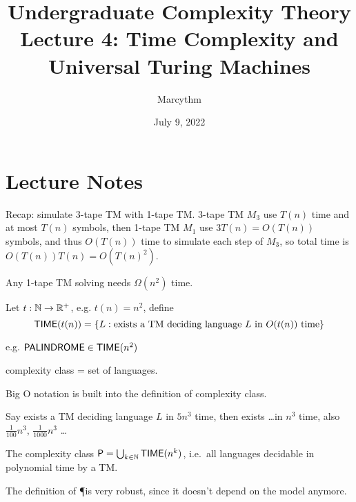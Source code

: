 \documentclass{article}
\title{Undergraduate Complexity Theory \\ Lecture 4: Time Complexity and Universal Turing Machines}
\author{Marcythm}
\date{July 9, 2022}
\begin{document}
\maketitle{}

\section{Lecture Notes}

Recap: simulate 3-tape TM with 1-tape TM. 3-tape TM \(M_3\) use \(T(n)\) time and at most \(T(n)\) symbols, then 1-tape TM \(M_1\) use \(3T(n) = O(T(n))\) symbols, and thus \(O(T(n))\) time to simulate each step of \(M_3\), so total time is \(O(T(n)) T(n) = O(T(n)^2)\).

\begin{theorem}[Hennie '65]
  Any 1-tape TM solving  needs \(\Omega(n^2)\) time.
\end{theorem}

\begin{definition}
  Let \(t: \mathbb N \to \mathbb R^+\), e.g. \(t(n) = n^2\), define
  \[ \text{\sf TIME}(t(n)) = \left\lbrace L : \text{exists a TM deciding language \(L\) in \(O(t(n))\) time} \right\rbrace \]
\end{definition}

e.g. \(\text{\sf PALINDROME} \in \text{\sf TIME}(n^2)\)

\begin{remark}
  complexity class = set of languages.
\end{remark}

\begin{remark}
  Big O notation is built into the definition of complexity class.
\end{remark}

\begin{fact}
  Say exists a TM deciding language \(L\) in \(5n^3\) time, then exists \ldots in \(n^3\) time, also \(\frac{1}{100}n^3\), \(\frac{1}{1000}n^3\) \ldots
\end{fact}

\begin{definition}
  The complexity class \(\text{\sf P} = \bigcup_{k \in \mathbb N} \text{\sf TIME}(n^k)\), i.e.\ all languages decidable in polynomial time by a TM.
\end{definition}

\begin{remark}
  The definition of \P is very robust, since it doesn't depend on the model anymore.
\end{remark}
\end{document}
